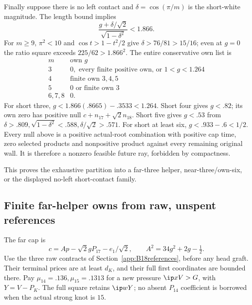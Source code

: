 Finally suppose there is no left contact and
\(\delta=\cos(\pi/m)\) is the short-white magnitude.
The length bound implies
\[
 \frac{g+\delta/\sqrt2}{\sqrt{1-\delta^2}}<1.866 .
\]
For \(m\geq9\), \(\pi^2<10\) and
\(\cos t>1-t^2/2\) give \(\delta>76/81>15/16\);
even at \(g=0\) the ratio square exceeds
\(225/62>1.866^2\). The entire conservative own list is
\[
\begin{array}{c|l}
m&\text{own }g\\ \hline
3&0,\text{ every finite positive own, or }1<g<1.264\\
4&\text{finite own }3,4,5\\
5&0\text{ or finite own }3\\
6,7,8&0 .
\end{array}
\]
For short three,
\(g<1.866(.8665)-.3533<1.264\).
Short four gives \(g<.82\); its own zero has positive null
\(c+n_{17}+\sqrt2n_{18}\).
Short five gives \(g<.53\) from
\(\delta>.809,\sqrt{1-\delta^2}<.588,\delta/\sqrt2>.571\).
For short at least six, \(g<.933-.6<1/2\).
Every null above is a positive actual-root combination with
positive cap time, zero selected products and nonpositive product
against every remaining original wall. It is therefore a nonzero
feasible future ray, forbidden by compactness.

This proves the exhaustive partition into a far-three helper,
near-three/own-six, or the displayed no-left short-contact family.

\subsection{Finite far-helper owns from raw, unspent references}
\label{app:B18finitefar}
The far cap is
\[
 c=A p-\sqrt2gP_{17}-e_1/\sqrt2,\qquad
 A^2=34g^2+2g-\tfrac12.
\]
Use the three raw contracts of Section~\ref{app:B18references},
before any head graft. Their terminal prices are at least
\(d_K\), and their full first coordinates are bounded there.
Pay \(\mu_{14}=.136,\mu_{15}=.1313\) for a new pressure
\(\ip xV>G\), with \(Y=V-P_K\).
The full square retains \(\ip wY\); no absent \(P_{14}\)
coefficient is borrowed when the actual strong knot is \(15\).

